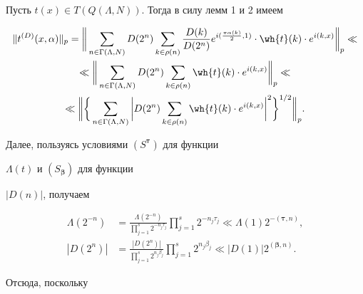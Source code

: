 \begin{pf}


Пусть $t(x)\in T(Q(\Lambda,N))$. Тогда в силу лемм 1 и 2 имеем


\begin{multline}\label{d 5}


\|t^{(D)}(x, \alpha)\|_p =\bigg\|\sum_


{n\in \Gamma(\Lambda,N)}D(2^{n})\sum_{k\in \rho (n)}


\frac{D(k)}{D(2^{n})} e^{i(\frac{\pi {\alpha}(k)}{2},1)} \cdot 


\wh{t}(k)\cdot e^{i(k, x)} \bigg\|_p \ll \\


%


\ll \bigg\|\sum_{n\in \Gamma(\Lambda,N)}D(2^{n})


\sum\limits_{k\in \rho (n)}\wh{t}(k)\cdot e^{i(k, x)}\bigg\|_p \ll \\


%


\ll \bigg\|\bigg\{ \sum_{n\in \Gamma(\Lambda,N)}\bigg


| D(2^{n})\sum_{k\in \rho (n)} \wh{t}(k)\cdot 


e^{i(k, x)}\bigg|^{ 2} \bigg \}^ {1/2}\bigg\|_p .


\end{multline} 


Далее, пользуясь условиями $(S^{\boldsymbol{\tau}})$ для функции 


$\Lambda( t)$ и $(S_{\boldsymbol{\beta}})$ для функции 


$|D(n)|$, получаем


\begin{align*}


\Lambda(2^{- n})&=\frac{\Lambda(2^{- n})}{\prod\limits^s_{j=1}2^{-n_j 


{\tau_j}}} \prod^s_{j=1} 2^ {-n_j {\tau_j}} \ll \Lambda(1) 


2^{-({\boldsymbol{\tau}}, n)}, \\


%


|D(2^n)| &=\frac{|D(2^{ n})|}{\prod\limits^s_{j=1}2^


{n_j {\beta_j}}} \prod^s_{j=1} 2^ {n_j {\beta_j}} \ll |D(1)| 


2^{({\boldsymbol{\beta}}, n)}.


\end{align*}


Отсюда, поскольку


\begin{multline*}



\end{multline*}
\end{pf}
